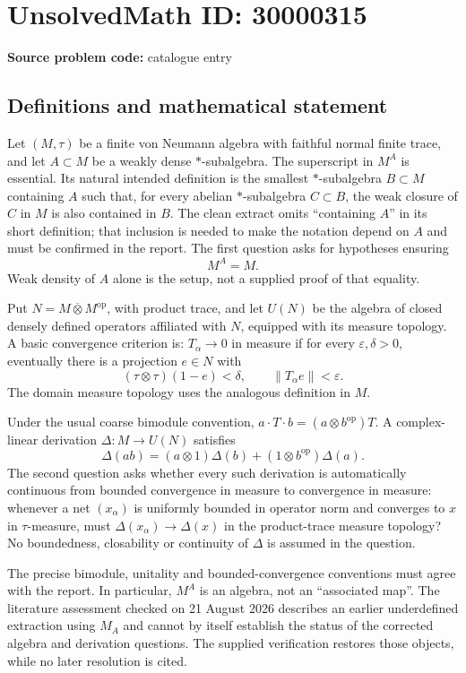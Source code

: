 \documentclass[11pt]{article}
\begin{document}
\section*{UnsolvedMath ID: 30000315}
\textbf{Source problem code:} catalogue entry
\subsection{Definitions and mathematical statement}
Let $(M,\tau)$ be a finite von Neumann algebra with faithful normal finite trace, and let $A\subset M$ be a weakly dense $*$-subalgebra. The superscript in $M^A$ is essential. Its natural intended definition is the smallest $*$-subalgebra $B\subset M$ containing $A$ such that, for every abelian $*$-subalgebra $C\subset B$, the weak closure of $C$ in $M$ is also contained in $B$. The clean extract omits ``containing $A$'' in its short definition; that inclusion is needed to make the notation depend on $A$ and must be confirmed in the report. The first question asks for hypotheses ensuring
\[
 M^A=M.
\]
Weak density of $A$ alone is the setup, not a supplied proof of that equality.

Put $N=M\mathbin{\overline\otimes}M^{\mathrm{op}}$, with product trace, and let $U(N)$ be the algebra of closed densely defined operators affiliated with $N$, equipped with its measure topology. A basic convergence criterion is: $T_\alpha\to0$ in measure if for every $\varepsilon,\delta>0$, eventually there is a projection $e\in N$ with
\[
 (\tau\otimes\tau)(1-e)<\delta,\qquad\|T_\alpha e\|<\varepsilon.
\]
The domain measure topology uses the analogous definition in $M$.

Under the usual coarse bimodule convention, $a\cdot T\cdot b=(a\otimes b^{\mathrm{op}})T$. A complex-linear derivation $\Delta:M\to U(N)$ satisfies
\[
 \Delta(ab)=(a\otimes1)\Delta(b)+(1\otimes b^{\mathrm{op}})\Delta(a).
\]
The second question asks whether every such derivation is automatically continuous from bounded convergence in measure to convergence in measure: whenever a net $(x_\alpha)$ is uniformly bounded in operator norm and converges to $x$ in $\tau$-measure, must $\Delta(x_\alpha)\to\Delta(x)$ in the product-trace measure topology? No boundedness, closability or continuity of $\Delta$ is assumed in the question.

The precise bimodule, unitality and bounded-convergence conventions must agree with the report. In particular, $M^A$ is an algebra, not an ``associated map''. The literature assessment checked on 21 August 2026 describes an earlier underdefined extraction using $M_A$ and cannot by itself establish the status of the corrected algebra and derivation questions. The supplied verification restores those objects, while no later resolution is cited.
\end{document}
